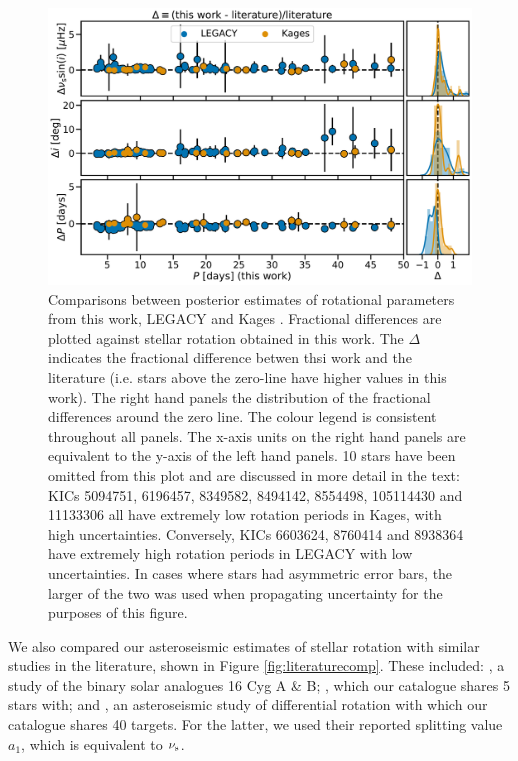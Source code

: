 \documentclass[12pt]{article}
\begin{document}
\begin{figure}
	\centering
	\includegraphics[width=\textwidth]{Images/litcomp_alt2.pdf}
	\caption{Comparisons between posterior estimates of rotational parameters from this work, LEGACY and Kages \cite[private communication]{davies+2016, lund+2017}. Fractional differences are plotted against stellar rotation obtained in this work. The $\Delta$ indicates the fractional difference betwen thsi work and the literature (i.e. stars above the zero-line have higher values in this work). The right hand panels the distribution of the fractional differences around the zero line. The colour legend is consistent throughout all panels. The x-axis units on the right hand panels are equivalent to the y-axis of the left hand panels. 10 stars have been omitted from this plot and are discussed in more detail in the text: KICs 5094751, 6196457, 8349582, 8494142, 8554498, 105114430 and 11133306 all have extremely low rotation periods in Kages, with high uncertainties. Conversely, KICs 6603624, 8760414 and 8938364 have extremely high rotation periods in LEGACY with low uncertainties. In cases where stars had asymmetric error bars, the larger of the two was used when propagating uncertainty for the purposes of this figure.}
	\label{fig:legacykages}
\end{figure}

We also compared our asteroseismic estimates of stellar rotation with similar studies in the literature, shown in Figure \ref{fig:literaturecomp}. These included: \cite{davies+2015}, a study of the binary solar analogues 16 Cyg A \& B; \cite{nielsen+2015}, which our catalogue shares 5 stars with; and \cite{benomar+2018}, an asteroseismic study of differential rotation with which our catalogue shares 40 targets. For the latter, we used their reported splitting value $a_1$, which is equivalent to $\nu_{\rm s}$. 
\end{document}
